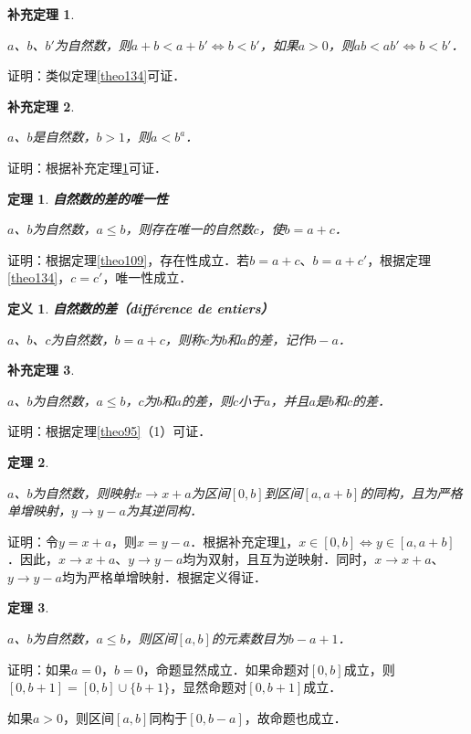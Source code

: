 \documentclass[12pt, a4paper, oneside]{book}
\newtheorem{theo}{定理}
\newtheorem{cor}{补充定理}
\newtheorem{de}{定义}
\begin{document}
			\begin{cor}\label{cor310}
				\hfill\par
				$a$、$b$、$b'$为自然数，则$a+b<a+b'\Leftrightarrow b<b'$，如果$a>0$，则$ab<ab'\Leftrightarrow b<b'$．
			\end{cor}
			证明：类似定理\ref{theo134}可证．
			
			\begin{cor}\label{cor311}
				\hfill\par
				$a$、$b$是自然数，$b>1$，则$a<b^a$．
			\end{cor}
			证明：根据补充定理\ref{cor310}可证．
			
			\begin{theo}\label{theo135}
				\textbf{自然数的差的唯一性}
				\par
				$a$、$b$为自然数，$a\leq b$，则存在唯一的自然数$c$，使$b=a+c$．
			\end{theo}
			证明：根据定理\ref{theo109}，存在性成立．若$b=a+c$、$b=a+c'$，根据定理\ref{theo134}，$c=c'$，唯一性成立．
			
			\begin{de}
				\textbf{自然数的差（différence de entiers）}
				\par
				$a$、$b$、$c$为自然数，$b=a+c$，则称$c$为$b$和$a$的差，记作$b-a$．
			\end{de}
			
			\begin{cor}\label{cor312}
				\hfill\par
				$a$、$b$为自然数，$a\leq b$，$c$为$b$和$a$的差，则$c$小于$a$，并且$a$是$b$和$c$的差．
			\end{cor}
			证明：根据定理\ref{theo95}（1）可证．
			
			\begin{theo}\label{theo136}
				\hfill\par
				$a$、$b$为自然数，则映射$x\to x+a$为区间$[0, b]$到区间$[a, a+b]$的同构，且为严格单增映射，$y\to y-a$为其逆同构．
			\end{theo}
			证明：令$y=x+a$，则$x=y-a$．根据补充定理\ref{cor310}，$x\in [0, b]\Leftrightarrow y\in [a, a+b]$．因此，$x\to x+a$、$y\to y-a$均为双射，且互为逆映射．同时，$x\to x+a$、$y\to y-a$均为严格单增映射．根据定义得证．
			
			\begin{theo}\label{theo137}
				\hfill\par
				$a$、$b$为自然数，$a\leq b$，则区间$[a, b]$的元素数目为$b-a+1$．
			\end{theo}
			证明：如果$a=0$，$b=0$，命题显然成立．如果命题对$[0, b]$成立，则$[0, b+1]=[0, b]\cup\{b+1\}$，显然命题对$[0, b+1]$成立．
			\par
			如果$a>0$，则区间$[a, b]$同构于$[0, b-a]$，故命题也成立．
			
\end{document}
